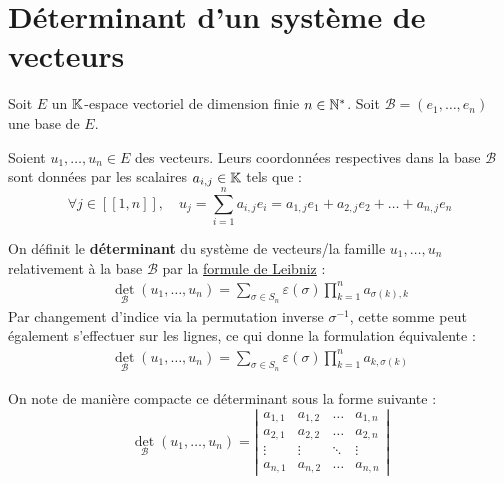 \documentclass[12pt, a4paper]{report}
\begin{document}
\chapter{Déterminant d'un système de vecteurs}

\begin{definition}
    Soit $E$ un $\mathbb{K}$-espace vectoriel de dimension finie $n \in \mathbb{N}^*$.
    Soit $\mathcal B = (e_1, \dots, e_n)$ une base de $E$.

    Soient $u_1,\dots,u_n \in E$ des vecteurs. Leurs coordonnées respectives dans la base $\mathcal{B}$ sont données par les scalaires $a_{i,j} \in \mathbb{K}$ tels que :
    $$\forall j \in [\![1,n]\!], \quad u_j = \sum_{i=1}^n a_{i,j} e_i = a_{1,j} e_1 + a_{2,j} e_2 + \dots + a_{n,j} e_n$$
    
    On définit le \textbf{déterminant} du système de vecteurs/la famille $u_1, \dots, u_n$ relativement à la base $\mathcal{B}$ par la \href{https://fr.wikipedia.org/wiki/Formule_de_Leibniz#D%C3%A9terminant_d'une_matrice_carr%C3%A9e}{formule de Leibniz} :
    \begin{align*}
        \det_{\mathcal{B}}(u_1, \dots, u_n) = \sum_{\sigma \in S_n} \varepsilon(\sigma) \prod_{k=1}^n a_{\sigma(k),k}
    \end{align*}
    Par changement d'indice via la permutation inverse $\sigma^{-1}$, cette somme peut également s'effectuer sur les lignes, ce qui donne la formulation équivalente :
    \begin{align*}
        \det_{\mathcal{B}}(u_1, \dots, u_n) = \sum_{\sigma \in S_n} \varepsilon(\sigma) \prod_{k=1}^n a_{k,\sigma(k)}
    \end{align*}

    On note de manière compacte ce déterminant sous la forme suivante :
    $$\det_{\mathcal{B}}(u_1, \dots, u_n) = \left|\begin{matrix} a_{1,1} & a_{1,2} & \dots & a_{1,n} \\ a_{2,1} & a_{2,2} & \dots & a_{2,n} \\ \vdots & \vdots & \ddots & \vdots \\ a_{n,1} & a_{n,2} & \dots & a_{n,n} \end{matrix}\right|$$
\end{definition}
\end{document}
